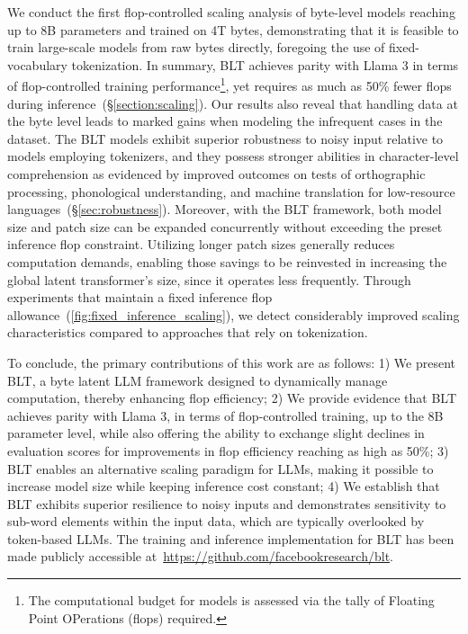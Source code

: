 We conduct the first flop-controlled scaling analysis of byte-level models reaching up to 8B parameters and trained on 4T bytes, demonstrating that it is feasible to train large-scale models from raw bytes directly, foregoing the use of fixed-vocabulary tokenization. In summary, {\textsc BLT} achieves parity with Llama 3 in terms of flop-controlled training performance\footnote{The computational budget for models is assessed via the tally of Floating Point OPerations (flops) required.}, yet requires as much as 50\% fewer flops during inference~(\S\ref{section:scaling}). Our results also reveal that handling data at the byte level leads to marked gains when modeling the infrequent cases in the dataset. The {\textsc BLT} models exhibit superior robustness to noisy input relative to models employing tokenizers, and they possess stronger abilities in character-level comprehension as evidenced by improved outcomes on tests of orthographic processing, phonological understanding, and machine translation for low-resource languages~(\S\ref{sec:robustness}). Moreover, with the {\textsc BLT} framework, both model size and patch size can be expanded concurrently without exceeding the preset inference flop constraint. Utilizing longer patch sizes generally reduces computation demands, enabling those savings to be reinvested in increasing the global latent transformer’s size, since it operates less frequently. Through experiments that maintain a fixed inference flop allowance~(\autoref{fig:fixed_inference_scaling}), we detect considerably improved scaling characteristics compared to approaches that rely on tokenization.

To conclude, the primary contributions of this work are as follows: 1) We present {\textsc BLT}, a byte latent LLM framework designed to dynamically manage computation, thereby enhancing flop efficiency; 2) We provide evidence that {\textsc BLT} achieves parity with Llama 3, in terms of flop-controlled training, up to the 8B parameter level, while also offering the ability to exchange slight declines in evaluation scores for improvements in flop efficiency reaching as high as 50\%; 3) {\textsc BLT} enables an alternative scaling paradigm for LLMs, making it possible to increase model size while keeping inference cost constant; 4) We establish that {\textsc BLT} exhibits superior resilience to noisy inputs and demonstrates sensitivity to sub-word elements within the input data, which are typically overlooked by token-based LLMs. The training and inference implementation for {\textsc BLT} has been made publicly accessible at~\url{https://github.com/facebookresearch/blt}.

